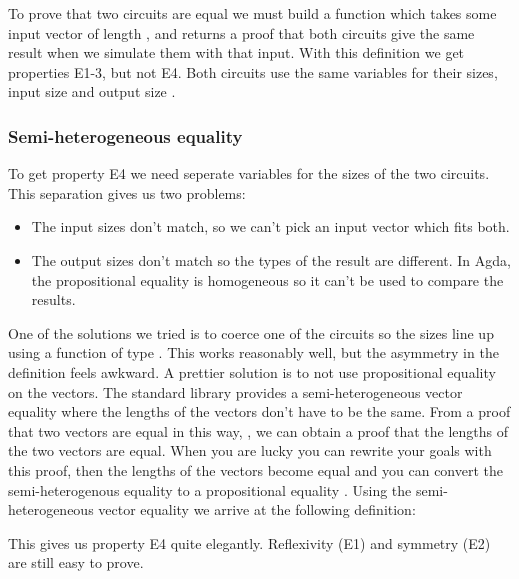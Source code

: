 
To prove that two circuits are equal we must build a function which
takes some input vector  of length , and returns a
proof that both circuits give the same result when we simulate them with
that input. With this definition we get properties E1-3, but not E4.
Both circuits use the same variables for their sizes, input size
 and output size .

\subsubsection{Semi-heterogeneous
equality}\label{semi-heterogeneous-equality}

To get property E4 we need seperate variables for the sizes of the two
circuits. This separation gives us two problems:

\begin{itemize}
\item
  The input sizes don't match, so we can't pick an input vector which
  fits both.
\item
  The output sizes don't match so the types of the result are different.
  In Agda, the propositional equality  is homogeneous so it
  can't be used to compare the results.
\end{itemize}

One of the solutions we tried is to coerce one of the circuits so the
sizes line up using a function of type  \AY{\{} 
 \AY{\}}      
        
.
This works reasonably well, but the asymmetry in the definition feels
awkward.
A prettier solution is to not use propositional equality on the
vectors.
The standard library provides a semi-heterogeneous vector
equality  where the lengths of the vectors don't have to be
the same. From a proof that two vectors are equal in this way,
  , we can obtain a proof that the lengths of the two
vectors are equal.
When you are lucky you can rewrite your goals with this proof, then
the lengths of the vectors become equal and you can convert the
semi-heterogenous equality to a propositional equality  
.
Using the semi-heterogeneous vector equality we arrive at the
following definition:


This gives us property E4 quite elegantly.
Reflexivity (E1) and symmetry (E2) are still easy to prove.

